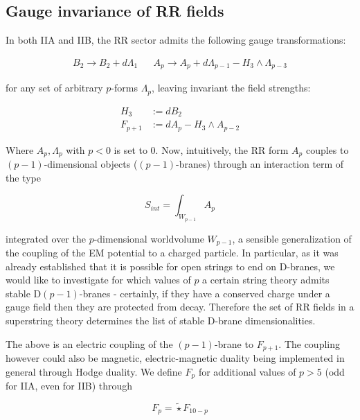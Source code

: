 \subsection{Gauge invariance of RR fields}

In both IIA and IIB, the RR sector admits the following gauge transformations:

\begin{align}
B_2 \rightarrow B_2 + d\Lambda_1 && A_p \rightarrow A_p + d\Lambda_{p-1} - H_3 \wedge \Lambda_{p-3}
\end{align}

for any set of arbitrary $p$-forms $\Lambda_p$, leaving invariant the field strengths:

\begin{equation}
\begin{aligned}
H_3 &:= dB_2 \\
F_{p+1} &:= dA_p - H_3 \wedge A_{p-2} \label{fieldstrengths}
\end{aligned}
\end{equation}

Where $A_{p}, \Lambda_p$ with $p<0$ is set to $0$. Now, intuitively, the RR form $A_p$ couples to $(p-1)$-dimensional objects ($(p-1)$-branes) through an interaction term of the type

\begin{equation}
	S_{int} = \int_{W_{p-1}} A_p
	\label{}
\end{equation}

integrated over the $p$-dimensional worldvolume $W_{p-1}$, a sensible generalization of the coupling of the EM potential to a charged particle. In particular, as it was already established that it is possible for open strings to end on D-branes, we would like to investigate for which values of $p$ a certain string theory admits stable D$(p-1)$-branes - certainly, if they have a conserved charge under a gauge field then they are protected from decay. Therefore the set of RR fields in a superstring theory determines the list of stable D-brane dimensionalities.

The above is an electric coupling of the $(p-1)$-brane to $F_{p+1}$. The coupling however could also be magnetic, electric-magnetic duality being implemented in general through Hodge duality. We define $F_p$ for additional values of $p > 5$ (odd for IIA, even for IIB) through

\begin{equation}
F_{p} = \widetilde\star F_{10-p}
\end{equation}

